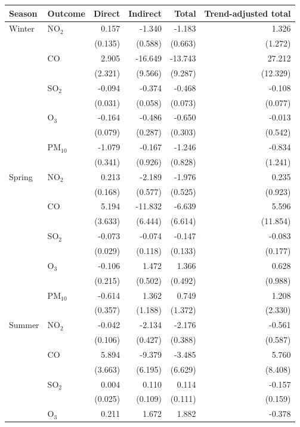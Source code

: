 \begin{tabular}{llrrrr}
\toprule
Season & Outcome & Direct & Indirect & Total & Trend-adjusted total \\
\midrule
Winter & NO$_2$ & 0.157 & -1.340 & -1.183 & 1.326 \\
 &  & (0.135) & (0.588) & (0.663) & (1.272) \\
 & CO & 2.905 & -16.649 & -13.743 & 27.212 \\
 &  & (2.321) & (9.566) & (9.287) & (12.329) \\
 & SO$_2$ & -0.094 & -0.374 & -0.468 & -0.108 \\
 &  & (0.031) & (0.058) & (0.073) & (0.077) \\
 & O$_3$ & -0.164 & -0.486 & -0.650 & -0.013 \\
 &  & (0.079) & (0.287) & (0.303) & (0.542) \\
 & PM$_{10}$ & -1.079 & -0.167 & -1.246 & -0.834 \\
 &  & (0.341) & (0.926) & (0.828) & (1.241) \\
\addlinespace[4pt]
Spring & NO$_2$ & 0.213 & -2.189 & -1.976 & 0.235 \\
 &  & (0.168) & (0.577) & (0.525) & (0.923) \\
 & CO & 5.194 & -11.832 & -6.639 & 5.596 \\
 &  & (3.633) & (6.444) & (6.614) & (11.854) \\
 & SO$_2$ & -0.073 & -0.074 & -0.147 & -0.083 \\
 &  & (0.029) & (0.118) & (0.133) & (0.177) \\
 & O$_3$ & -0.106 & 1.472 & 1.366 & 0.628 \\
 &  & (0.215) & (0.502) & (0.492) & (0.988) \\
 & PM$_{10}$ & -0.614 & 1.362 & 0.749 & 1.208 \\
 &  & (0.357) & (1.188) & (1.372) & (2.330) \\
\addlinespace[4pt]
Summer & NO$_2$ & -0.042 & -2.134 & -2.176 & -0.561 \\
 &  & (0.106) & (0.427) & (0.388) & (0.587) \\
 & CO & 5.894 & -9.379 & -3.485 & 5.760 \\
 &  & (3.663) & (6.195) & (6.629) & (8.408) \\
 & SO$_2$ & 0.004 & 0.110 & 0.114 & -0.157 \\
 &  & (0.025) & (0.109) & (0.111) & (0.159) \\
 & O$_3$ & 0.211 & 1.672 & 1.882 & -0.378 \\

\end{tabular}
